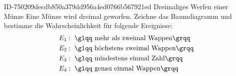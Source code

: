 \begin{exercise}
      {ID-750209decdb850a379dd956a4ed0766b567921ed}
      {Dreimaliges Werfen einer Münze}
  \ifproblem\problem
    Eine Münze wird dreimal geworfen. Zeichne das Baumdiagramm und bestimme
    die Wahrscheinlichkeit für folgende Ereignisse:
    \begin{equation*}
      \begin{split}
        E_1&:\;\text{\glqq mehr als zweimal Wappen\grqq} \\
        E_2&:\;\text{\glqq höchstens zweimal Wappen\grqq} \\
        E_3&:\;\text{\glqq mindestens einmal Zahl\grqq} \\
        E_4&:\;\text{\glqq genau einmal Wappen\grqq}
      \end{split}
    \end{equation*}
  \fi
  \ifoutcome\outcome
    \begin{center}
\end{center}
\end{exercise}
